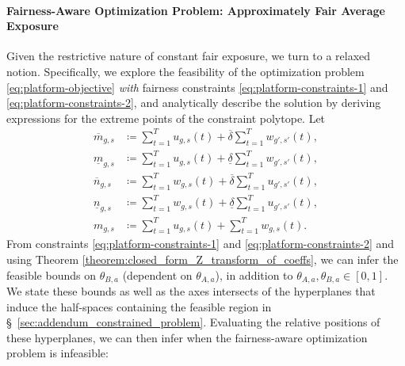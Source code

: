 \documentclass[letterpaper]{article} %
\begin{document}
\paragraph{Fairness-Aware Optimization Problem: Approximately Fair Average Exposure}
Given the restrictive nature of constant fair exposure, we  turn to a relaxed notion.
Specifically, we explore the feasibility of the optimization problem \eqref{eq:platform-objective} \emph{with} fairness constraints \eqref{eq:platform-constraints-1} and \eqref{eq:platform-constraints-2}, and analytically describe the solution by deriving expressions for the extreme points of the constraint polytope.
%
Let
\footnotesize
\begin{align*}
    \overline{m}_{g,s} &\coloneqq \sum_{t=1}^T u_{g,s}(t) + \overline{\delta}\sum_{t=1}^T w_{g',s'}(t), \\
    \underline{m}_{g,s} &\coloneqq \sum_{t=1}^T u_{g,s}(t) + \underline{\delta}\sum_{t=1}^T w_{g',s'}(t), \\
    \overline{n}_{g,s} &\coloneqq \sum_{t=1}^T w_{g,s}(t) + \overline{\delta}\sum_{t=1}^T u_{g',s'}(t), \\
    \underline{n}_{g,s} &\coloneqq \sum_{t=1}^T w_{g,s}(t) + \underline{\delta}\sum_{t=1}^T u_{g',s'}(t), \\
    m_{g,s} &\coloneqq \sum_{t=1}^T u_{g,s}(t) + \sum_{t=1}^T w_{g,s}(t).
\end{align*}
\normalsize
%
From constraints \eqref{eq:platform-constraints-1} and \eqref{eq:platform-constraints-2} and using Theorem \ref{theorem:closed_form_Z_transform_of_coeffs}, we can infer the feasible bounds on $\theta_{B,a}$ (dependent on $\theta_{A,a}$), in addition to $\theta_{A,a}, \theta_{B,a} \in [0,1]$.
%
We state these bounds as well as the axes intersects of the hyperplanes that induce the half-spaces containing the feasible region in \S~\ref{sec:addendum_constrained_problem}.
%
Evaluating the relative positions of these hyperplanes, we can then infer when the fairness-aware optimization problem is infeasible:
\end{document}
